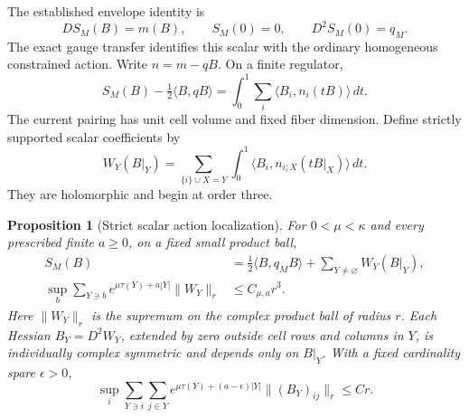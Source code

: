 \documentclass[11pt]{article}
\newtheorem{proposition}[theorem]{Proposition}
\theoremstyle{remark}
\begin{document}
The established envelope identity is
\begin{equation}
 DS_M(B)=m(B),\qquad S_M(0)=0,\qquad D^2S_M(0)=q_M.          \label{cl-envelope-input}
\end{equation}
The exact gauge transfer identifies this scalar with the ordinary
homogeneous constrained action. Write $n=m-qB$. On a finite regulator,
\begin{equation}
 S_M(B)-\tfrac12\langle B,qB\rangle
    =\int_0^1\sum_i\langle B_i,n_i(tB)\rangle\,dt.           \label{cl-envelope}
\end{equation}
The current pairing has unit cell volume and fixed fiber dimension.
Define strictly supported scalar coefficients by
\begin{equation}
 W_Y(B|_Y)=
 \sum_{\{i\}\cup X=Y}\int_0^1
       \langle B_i,n_{i;X}(tB|_X)\rangle\,dt.                \label{cl-action-coefficients}
\end{equation}
They are holomorphic and begin at order three.

\begin{proposition}[Strict scalar action localization]
\label{cl-action-theorem}
For $0<\mu<\kappa$ and every prescribed finite $a\ge0$, on a fixed
small product ball,
\begin{align}
 S_M(B)&=\tfrac12\langle B,q_MB\rangle+\sum_{Y\ne\varnothing}W_Y(B|_Y),
                                                               \label{cl-action-expansion}\\
 \sup_b\sum_{Y\ni b}e^{\mu\tau(Y)+a|Y|}\|W_Y\|_r
       &\le C_{\mu,a}r^3.                                    \label{cl-action-norm}
\end{align}
Here $\|W_Y\|_r$ is the supremum on the complex product ball of radius
$r$. Each Hessian $B_Y=D^2W_Y$, extended by zero outside cell rows and
columns in $Y$, is individually complex symmetric and depends only on
$B|_Y$. With a fixed cardinality spare $\epsilon>0$,
\begin{equation}
 \sup_i\sum_{Y\ni i}\sum_{j\in Y}
 e^{\mu\tau(Y)+(a-\epsilon)|Y|}
            \|(B_Y)_{ij}\|_r\le C r.                       \label{cl-hessian-support}
\end{equation}
\end{proposition}
\end{document}
